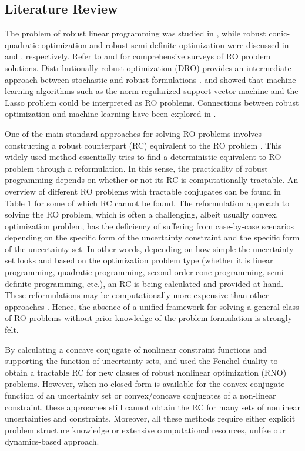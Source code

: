\documentclass[journal,twoside,web]{ieeecolor}
\newcommand{\rev}[1]{\textcolor{revisionblue}{#1}}
\begin{document}
\subsection*{\rev{Literature Review}} The problem of robust linear programming was studied in \cite{bental1999}, while robust conic-quadratic optimization and robust semi-definite optimization were discussed in \cite{bental2002} and \cite{bental1998}, respectively. Refer to \cite{bertsimas2011} and \cite{beyer2007} for comprehensive surveys of RO problem solutions. Distributionally robust optimization (DRO) provides an intermediate approach between stochastic and robust formulations \cite{aigner2023,yang2023}. \cite{xu2009} and \cite{xu2010} showed that machine learning algorithms such as the norm-regularized support vector machine and the Lasso problem could be interpreted as RO problems. Connections between robust optimization and machine learning have been explored in \cite{zhu2023zeroth,madry2018adversarial}.

One of the main standard approaches for solving RO problems involves constructing a robust counterpart (RC) equivalent to the RO problem \cite{bental2009}. This widely used method essentially tries to find a deterministic equivalent to RO problem through a reformulation. In this sense, the practicality of robust programming depends on whether or not its RC is computationally tractable. An overview of different RO problems with tractable conjugates can be found in \cite{gorissen20152} Table 1 for some of which RC cannot be found.
The reformulation approach to solving the RO problem, which is often a challenging, albeit usually convex, optimization problem, has the deficiency of suffering from case-by-case scenarios depending on the specific form of the uncertainty constraint and the specific form of the uncertainty set. In other words, depending on how simple the uncertainty set looks and based on the optimization problem type (whether it is linear programming, quadratic programming, second-order cone programming, semi-definite programming, etc.), an RC is being calculated and provided at hand. These reformulations may be computationally more expensive than other approaches \cite{bertsimas2016}. Hence, the absence of a unified framework for solving a general class of RO problems without prior knowledge of the problem formulation is strongly felt.

By calculating a concave conjugate of nonlinear constraint functions and supporting the function of uncertainty sets, \cite{bental20152} and \cite{gorissen20152} used the Fenchel duality to obtain a tractable RC for new classes of robust nonlinear optimization (RNO) problems. However, when no closed form is available for the convex conjugate function of an uncertainty set or convex/concave conjugates of a non-linear constraint, these approaches still cannot obtain the RC for many sets of nonlinear uncertainties and constraints. \rev{Moreover, all these methods require either explicit problem structure knowledge or extensive computational resources, unlike our dynamics-based approach.}
\end{document}
